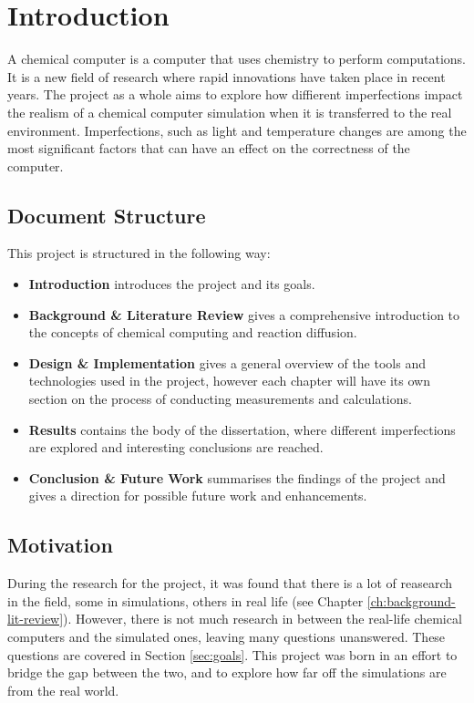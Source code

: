 \chapter{Introduction}

A chemical computer is a computer that uses chemistry to perform computations. It is a new field of research where rapid innovations have taken place in recent years.
The project as a whole aims to explore how diffierent imperfections impact the realism of a chemical computer simulation when it is transferred to the real environment. 
Imperfections, such as light and temperature changes are among the most significant factors that can have an effect on the correctness of the computer.

\section{Document Structure}
This project is structured in the following way:

\begin{itemize}
    \item \textbf{Introduction} introduces the project and its goals.
    \item \textbf{Background \& Literature Review} gives a comprehensive introduction to the concepts of chemical computing and reaction diffusion.
    \item \textbf{Design \& Implementation} gives a general overview of the tools and technologies used in the project, however each chapter will have its own section on the process of conducting measurements and calculations.
    \item \textbf{Results} contains the body of the dissertation, where different imperfections are explored and interesting conclusions are reached.
    \item \textbf{Conclusion \& Future Work} summarises the findings of the project and gives a direction for possible future work and enhancements.
\end{itemize}

\section{Motivation}
During the research for the project, it was found that there is a lot of reasearch in the field, some in simulations, others in real life (see Chapter \ref{ch:background-lit-review}). 
However, there is not much research in between the real-life chemical computers and the simulated ones, leaving many questions unanswered. These questions are covered in Section \ref{sec:goals}.
This project was born in an effort to bridge the gap between the two, and to explore how far off the simulations are from the real world.


